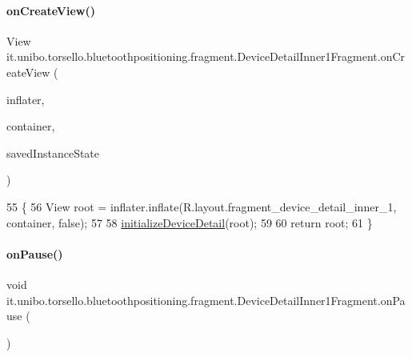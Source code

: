 \paragraph{\texorpdfstring{on\+Create\+View()}{onCreateView()}}
{\footnotesize\ttfamily View it.\+unibo.\+torsello.\+bluetoothpositioning.\+fragment.\+Device\+Detail\+Inner1\+Fragment.\+on\+Create\+View (\begin{DoxyParamCaption}\item[{Layout\+Inflater}]{inflater,  }\item[{View\+Group}]{container,  }\item[{Bundle}]{saved\+Instance\+State }\end{DoxyParamCaption})}


\begin{DoxyCode}
55                                                                                                       \{
56         View root = inflater.inflate(R.layout.fragment\_device\_detail\_inner\_1, container, \textcolor{keyword}{false});
57 
58         \hyperlink{classit_1_1unibo_1_1torsello_1_1bluetoothpositioning_1_1fragment_1_1DeviceDetailInner1Fragment_a1d1f9def45a374e0fd22bf443ff609a4_a1d1f9def45a374e0fd22bf443ff609a4}{initializeDeviceDetail}(root);
59 
60         \textcolor{keywordflow}{return} root;
61     \}
\end{DoxyCode}
\hypertarget{classit_1_1unibo_1_1torsello_1_1bluetoothpositioning_1_1fragment_1_1DeviceDetailInner1Fragment_a7579453e29121da309ed08d902be67b9_a7579453e29121da309ed08d902be67b9}{}\label{classit_1_1unibo_1_1torsello_1_1bluetoothpositioning_1_1fragment_1_1DeviceDetailInner1Fragment_a7579453e29121da309ed08d902be67b9_a7579453e29121da309ed08d902be67b9} 
\paragraph{\texorpdfstring{on\+Pause()}{onPause()}}
{\footnotesize\ttfamily void it.\+unibo.\+torsello.\+bluetoothpositioning.\+fragment.\+Device\+Detail\+Inner1\+Fragment.\+on\+Pause (\begin{DoxyParamCaption}{ }\end{DoxyParamCaption})}


